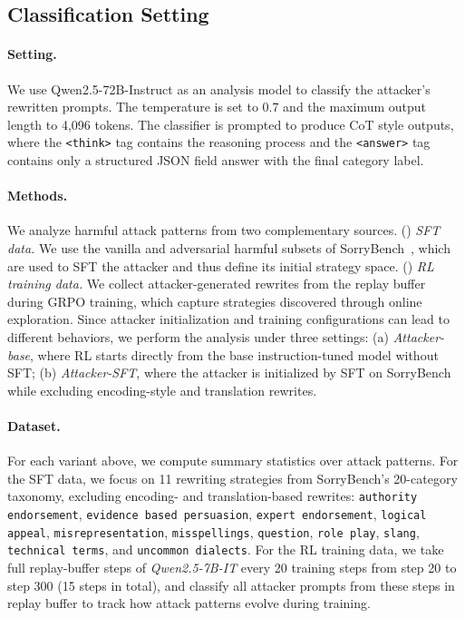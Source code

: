 \documentclass[11pt, letterpaper]{template}
\theoremstyle{plain}
\theoremstyle{definition}
\theoremstyle{remark}
\begin{document}
\subsection{Classification Setting}
\paragraph{Setting.} We use Qwen2.5-72B-Instruct as an analysis model to classify the attacker's rewritten prompts. The temperature is set to 0.7 and the maximum output length to 4{,}096 tokens. The classifier is prompted to produce CoT style outputs, where the \texttt{<think>} tag contains the reasoning process and the \texttt{<answer>} tag contains only a structured JSON field answer with the final category label.
	
\paragraph{Methods.} We analyze harmful attack patterns from two complementary sources. () \emph{SFT data.} We use the vanilla and adversarial harmful subsets of SorryBench~\citep{xie2024sorry}, which are used to SFT the attacker and thus define its initial strategy space. () \emph{RL training data.} We collect attacker-generated rewrites from the replay buffer during GRPO training, which capture strategies discovered through online exploration. Since attacker initialization and training configurations can lead to different behaviors, we perform the analysis under three settings: (a) \textit{Attacker-base}, where RL starts directly from the base instruction-tuned model without SFT; (b) \textit{Attacker-SFT}, where the attacker is initialized by SFT on SorryBench while excluding encoding-style and translation rewrites.


\paragraph{Dataset.} For each variant above, we compute summary statistics over attack patterns. For the SFT data, we focus on 11 rewriting strategies from SorryBench's 20-category taxonomy, excluding encoding- and translation-based rewrites: \texttt{authority endorsement}, \texttt{evidence based persuasion}, \texttt{expert endorsement}, \texttt{logical appeal}, \texttt{misrepresentation}, \texttt{misspellings}, \texttt{question}, \texttt{role play}, \texttt{slang}, \texttt{technical terms}, and \texttt{uncommon dialects}. For the RL training data, we take full replay-buffer steps of \textit{Qwen2.5-7B-IT} every 20 training steps from step 20 to step 300 (15 steps in total), and classify all attacker prompts from these steps in replay buffer to track how attack patterns evolve during training.
\end{document}
